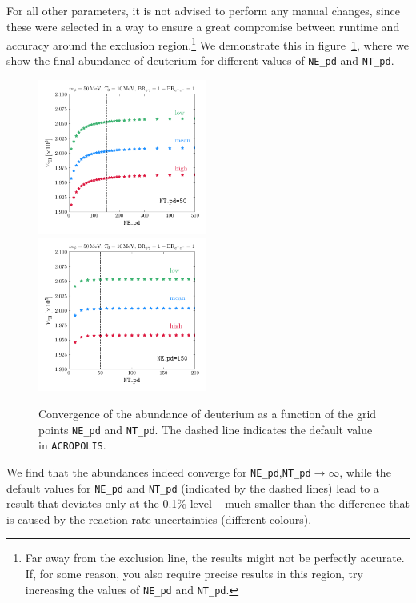 \documentclass[11pt,a4paper]{article}
\begin{document}
For all other parameters, it is not advised to perform any manual changes, since these were selected in a way to ensure a great compromise between runtime and accuracy around the exclusion region.\footnote{Far away from the exclusion line, the results might not be perfectly accurate. If, for some reason, you also require precise results in this region, try increasing the values of \texttt{NE\_pd} and \texttt{NT\_pd}.} We demonstrate this in figure~\ref{fig:convergence}, where we show the final abundance of deuterium for different values of \texttt{NE\_pd} and \texttt{NT\_pd}.
\begin{figure}
	\includegraphics[width=0.495\textwidth]{plots/NE.pdf}
	\includegraphics[width=0.495\textwidth]{plots/NT.pdf}
	\caption{Convergence of the abundance of deuterium as a function of the grid points \texttt{NE\_pd} and \texttt{NT\_pd}. The dashed line indicates the default value in \texttt{ACROPOLIS}.}
	\label{fig:convergence}
\end{figure}
We find that the abundances indeed converge for \texttt{NE\_pd},\texttt{NT\_pd}$\rightarrow \infty$, while the default values for \texttt{NE\_pd} and \texttt{NT\_pd} (indicated by the dashed lines) lead to a result that deviates only at the 0.1\% level
-- much smaller than the difference that is caused by the reaction rate uncertainties (different colours).
\end{document}
